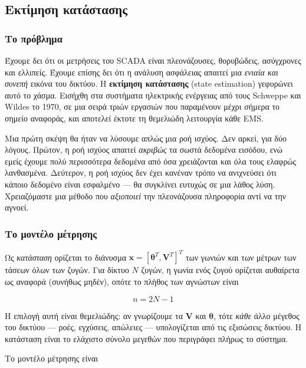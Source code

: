 \subsection{Εκτίμηση κατάστασης}
\label{sec:se}

\subsubsection*{Το πρόβλημα}

Έχουμε δει ότι οι μετρήσεις του SCADA είναι πλεονάζουσες, θορυβώδεις, ασύγχρονες και
ελλιπείς. Έχουμε επίσης δει ότι η ανάλυση ασφάλειας απαιτεί μια \emph{ενιαία και συνεπή}
εικόνα του δικτύου. Η \textbf{εκτίμηση κατάστασης} (state estimation) γεφυρώνει αυτό το
χάσμα. Εισήχθη στα συστήματα ηλεκτρικής ενέργειας από τους Schweppe και Wildes το 1970,
σε μια σειρά τριών εργασιών που παραμένουν μέχρι σήμερα το σημείο αναφοράς, και αποτελεί
έκτοτε τη θεμελιώδη λειτουργία κάθε EMS.

Μια πρώτη σκέψη θα ήταν να λύσουμε απλώς μια ροή ισχύος. Δεν αρκεί, για δύο λόγους. Πρώτον,
η ροή ισχύος απαιτεί \emph{ακριβώς} τα σωστά δεδομένα εισόδου, ενώ εμείς έχουμε πολύ
περισσότερα δεδομένα από όσα χρειάζονται και όλα τους ελαφρώς λανθασμένα. Δεύτερον, η ροή
ισχύος δεν έχει κανέναν τρόπο να ανιχνεύσει ότι κάποιο δεδομένο είναι εσφαλμένο — θα
συγκλίνει ευτυχώς σε μια λάθος λύση. Χρειαζόμαστε μια μέθοδο που \emph{αξιοποιεί} την
πλεονάζουσα πληροφορία αντί να την αγνοεί.

\subsubsection*{Το μοντέλο μέτρησης}

Ως \emph{κατάσταση} ορίζεται το διάνυσμα
$\mathbf{x} = [\boldsymbol{\theta}^{T}, \mathbf{V}^{T}]^{T}$ των γωνιών και των μέτρων των
τάσεων όλων των ζυγών. Για δίκτυο $N$ ζυγών, η γωνία ενός ζυγού ορίζεται αυθαίρετα ως
αναφορά (συνήθως μηδέν), οπότε το πλήθος των αγνώστων είναι

\begin{equation}
n = 2N - 1
\label{eq:nstates}
\end{equation}

Η επιλογή αυτή είναι θεμελιώδης: αν γνωρίζουμε τα $\mathbf{V}$ και $\boldsymbol{\theta}$,
τότε \emph{κάθε} άλλο μέγεθος του δικτύου — ροές, εγχύσεις, απώλειες — υπολογίζεται από τις
εξισώσεις δικτύου. Η κατάσταση είναι το ελάχιστο σύνολο μεγεθών που περιγράφει πλήρως το
σύστημα.

Το μοντέλο μέτρησης είναι


